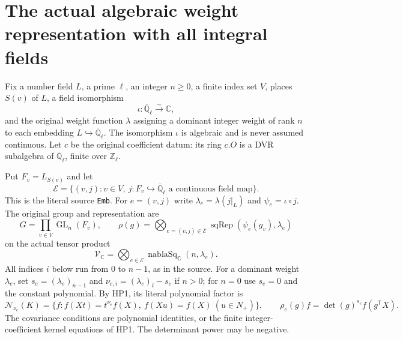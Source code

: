 \section{The actual algebraic weight representation with all integral fields}
\label{sec:weight-representation-v42}


Fix a number field $L$, a prime $\ell$, an integer $n\geq0$, a
finite index set $V$, places $S(v)$ of $L$, a field isomorphism
\[
             \iota:\overline{\mathbb Q}_\ell\xrightarrow{\sim}
                                                              \mathbb C,
\]
and the original weight function $\lambda$ assigning a dominant
integer weight of rank $n$ to each embedding
$L\hookrightarrow\overline{\mathbb Q}_\ell$.  The isomorphism
$\iota$ is algebraic and is never assumed continuous.  Let $c$
be the original coefficient datum: its ring $c.O$ is a DVR
subalgebra of $\overline{\mathbb Q}_\ell$, finite over
$\mathbb Z_\ell$.

Put $F_v=L_{S(v)}$ and let
\[
 \mathcal E=\{(v,j):v\in V,\ j:F_v\hookrightarrow
           \overline{\mathbb Q}_\ell\text{ a continuous field map}\}.
\]
This is the literal source \texttt{Emb}.  For $e=(v,j)$ write
$\lambda_e=\lambda(j|_L)$ and $\psi_e=\iota\circ j$.
The original group and representation are
\begin{equation}\label{eq:wrp-algrep}
 G=\prod_{v\in V}\operatorname{GL}_n(F_v),\qquad
 \rho(g)=\bigotimes_{e=(v,j)\in\mathcal E}
                 \operatorname{sqRep}(\psi_e(g_v),\lambda_e)
\end{equation}
on the actual tensor product
\[
 \mathcal V_{\mathbb C}=
       \bigotimes_{e\in\mathcal E}
                  \operatorname{nablaSq}_{\mathbb C}(n,\lambda_e).
\]
All indices $i$ below run from $0$ to $n-1$, as in the source.
For a dominant weight $\lambda_e$, set $s_e=(\lambda_e)_{n-1}$
and $\nu_{e,i}=(\lambda_e)_i-s_e$ if $n>0$; for $n=0$ use
$s_e=0$ and the constant polynomial.  By HP1, its literal
polynomial factor is
\begin{equation}\label{eq:wrp-polynomial}
 \mathcal N_{\nu_e}(K)=\{f:f(Xt)=t^{\nu_e}f(X),\
                                  f(Xu)=f(X)\ (u\in N_+)\},
 \qquad \rho_e(g)f=\det(g)^{s_e}f(g^{\mathsf T}X).
\end{equation}
The covariance conditions are polynomial identities, or the
finite integer-coefficient kernel equations of HP1.  The
determinant power may be negative.

